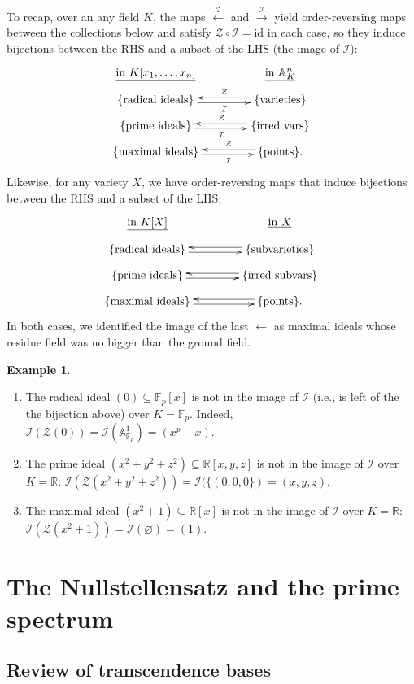 \documentclass{amsart}[12pt]
\newcommand{\A}{\mathbb{A}}
\newcommand{\R}{{\mathbb{R}}}
\newcommand{\F}{\mathbb{F}}
\newcommand{\cZ}{\mathcal{Z}}
\newcommand{\cI}{\mathcal{I}}
\numberwithin{equation}{section}
\theoremstyle{plain} %
\theoremstyle{definition}
\newtheorem{ex}[equation]{Example}
\theoremstyle{remark}
\renewcommand{\sec}[1]{\section{#1}}
\newcommand{\ssec}[1]{\subsection{#1}}
\begin{document}
To recap, over an any field $K$, the maps $\xleftarrow{\cZ}$ and $\xrightarrow{\cI}$ yield order-reversing maps between the collections below and satisfy $\cZ \circ \cI = \mathrm{id}$ in each case, so they induce bijections between the RHS and a subset of the LHS (the image of $\cI$):
\[ \xymatrix@R=.7em@C=4em{ \text{\underline{in $K[x_1,\dots,x_n]$}} &  \text{\underline{in $\A^n_K$}}  \\
\{\text{radical ideals}\} \ar@<-.5ex>[r]_-{\cI} & \ar@<-.5ex>[l]_-{\cZ} \{\text{varieties} \} \\
\{\text{prime ideals}\} \ar@<-.5ex>[r]_-{\cI} & \ar@<-.5ex>[l]_-{\cZ}  \{\text{irred vars} \} \\
\{\text{maximal ideals}\} \ar@<-.5ex>[r]_-{\cI} & \ar@<-.5ex>[l]_-{\cZ}  \{\text{points} \}. }\]
 Likewise, for any variety $X$, we have order-reversing maps that induce bijections between the RHS and a subset of the LHS:
\[ \xymatrix@R=.7em@C=4em{ \text{\underline{in $K[X]$}} &  \text{\underline{in $X$}}  \\
\{\text{radical ideals}\} \ar@<-.5ex>[r] & \ar@<-.5ex>[l] \{\text{subvarieties} \} \\
\{\text{prime ideals}\} \ar@<-.5ex>[r] & \ar@<-.5ex>[l]  \{\text{irred subvars} \} \\
\{\text{maximal ideals}\} \ar@<-.5ex>[r] & \ar@<-.5ex>[l]  \{\text{points} \}. }\]
In both cases, we identified the image of the last $\leftarrow$ as maximal ideals whose residue field was no bigger than the ground field.

 
 \begin{ex} \begin{enumerate} \item The radical ideal $(0) \subseteq \F_p[x]$ is not in the image of $\cI$ (i.e., is left of the the bijection above) over $K=\F_p$. Indeed, $\cI(\cZ(0)) = \cI(\A^1_{\F_p}) = (x^p-x)$.
 \item The prime ideal $(x^2+y^2+z^2) \subseteq \R[x,y,z]$ is not in the image of $\cI$ over $K=\R$: $\cI(\cZ(x^2+y^2+z^2))= \cI(\{(0,0,0\}) = (x,y,z)$.
 \item The maximal ideal $(x^2+1) \subseteq \R[x]$ is not in the image of $\cI$ over $K=\R$: $\cI(\cZ(x^2+1))=\cI(\varnothing) = (1)$.
 \end{enumerate}\end{ex}
 


\sec{The Nullstellensatz and the prime spectrum}


\ssec{Review of transcendence bases}
\end{document}
